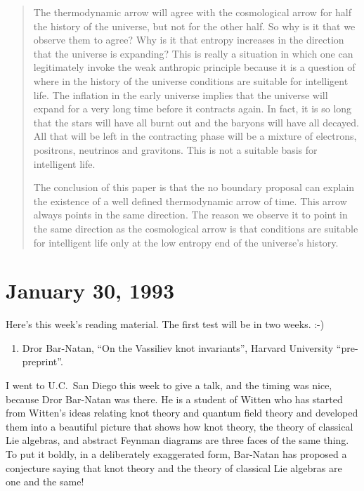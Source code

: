 \documentclass[12pt]{article}
\def\tightlist{}
\begin{document}
\begin{quote}

The thermodynamic arrow will agree with the cosmological arrow for half
the history of the universe, but not for the other half. So why is it
that we observe them to agree? Why is it that entropy increases in the
direction that the universe is expanding? This is really a situation in
which one can legitimately invoke the weak anthropic principle because
it is a question of where in the history of the universe conditions are
suitable for intelligent life. The inflation in the early universe
implies that the universe will expand for a very long time before it
contracts again. In fact, it is so long that the stars will have all
burnt out and the baryons will have all decayed. All that will be left
in the contracting phase will be a mixture of electrons, positrons,
neutrinos and gravitons. This is not a suitable basis for intelligent
life.

The conclusion of this paper is that the no boundary proposal can
explain the existence of a well defined thermodynamic arrow of time.
This arrow always points in the same direction. The reason we observe it
to point in the same direction as the cosmological arrow is that
conditions are suitable for intelligent life only at the low entropy end
of the universe's history.
\end{quote}



\hypertarget{week3}{%
\section{January 30, 1993}\label{week3}}

Here's this week's reading material. The first test will be in two
weeks. :-)

\begin{enumerate}
\def\labelenumi{\arabic{enumi})}
\tightlist
\item
   Dror Bar-Natan, ``On the Vassiliev knot invariants'', Harvard
  University ``pre-preprint''.
\end{enumerate}

I went to U.C.\ San Diego this week to give a talk, and the timing was
nice, because Dror Bar-Natan was there. He is a student of Witten who
has started from Witten's ideas relating knot theory and quantum field
theory and developed them into a beautiful picture that shows how knot
theory, the theory of classical Lie algebras, and abstract Feynman
diagrams are three faces of the same thing. To put it boldly, in a
deliberately exaggerated form, Bar-Natan has proposed a conjecture
saying that knot theory and the theory of classical Lie algebras are one
and the same!
\end{document}
